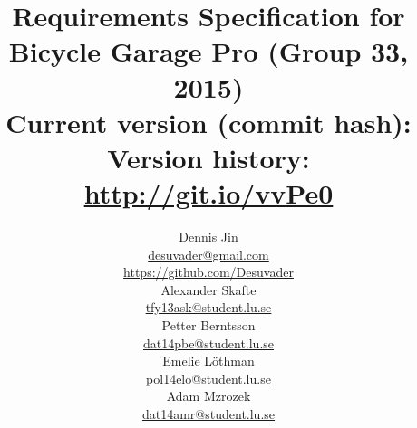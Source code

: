 \title{
	Requirements Specification for Bicycle Garage Pro (Group 33, 2015)\\
	\vspace{0.2in}
	\normalsize Current version (commit hash): \gitAbbrevHash\\
	\normalsize Version history: \url{http://git.io/vvPe0}
}
\author{
	Dennis Jin\\
	\url{desuvader@gmail.com}\\
	\url{https://github.com/Desuvader}\\
	Alexander Skafte\\
	\url{tfy13ask@student.lu.se}\\
	Petter Berntsson\\
	\url{dat14pbe@student.lu.se}\\
	Emelie Löthman\\
	\url{pol14elo@student.lu.se}\\
	Adam Mzrozek\\
	\url{dat14amr@student.lu.se}
}
\date{}
